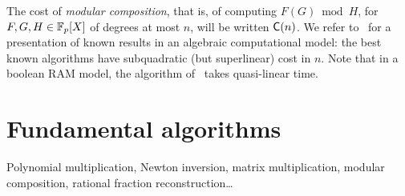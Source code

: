 The cost of {\em modular composition}, that is, of computing $F(G)
\bmod H$, for $F,G,H\in\mathbb{F}_p[X]$ of degrees at most $n$, will be
written $\mathrm{\sf C}(n)$. We refer to~\cite[Ch.~12]{vzGG} for a
presentation of known results in an algebraic computational model: the
best known algorithms have subquadratic (but superlinear) cost in
$n$. Note that in a boolean RAM model, the algorithm of~\cite{KeUm08}
takes quasi-linear time.

\section{Fundamental algorithms}
Polynomial multiplication, Newton inversion, matrix multiplication,
modular composition, rational fraction reconstruction\ldots




